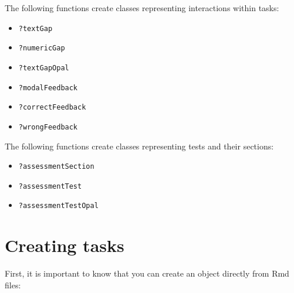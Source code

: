\documentclass[twoside]{tufte-book}
\providecommand{\tightlist}{%
  \setlength{\itemsep}{0pt}\setlength{\parskip}{0pt}}
\begin{document}
The following functions create classes representing interactions within tasks:

\begin{itemize}
\tightlist
\item
  \texttt{?textGap}
\item
  \texttt{?numericGap}
\item
  \texttt{?textGapOpal}
\item
  \texttt{?modalFeedback}
\item
  \texttt{?correctFeedback}
\item
  \texttt{?wrongFeedback}
\end{itemize}

The following functions create classes representing tests and their sections:

\begin{itemize}
\tightlist
\item
  \texttt{?assessmentSection}
\item
  \texttt{?assessmentTest}
\item
  \texttt{?assessmentTestOpal}
\end{itemize}

\section{Creating tasks}\label{creating-tasks}

First, it is important to know that you can create an object directly from Rmd files:
\end{document}
